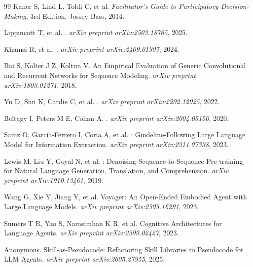\documentclass[12pt,a4paper]{ctexart}
\begin{document}
\begin{thebibliography}{99}
Kaner S, Lind L, Toldi C, et al.
\newblock \emph{Facilitator's Guide to Participatory Decision-Making}, 3rd Edition.
\newblock Jossey-Bass, 2014.

Lippincott T, et al.
.
\newblock \emph{arXiv preprint arXiv:2503.18765}, 2025.

Khamsi R, et al.
.
\newblock \emph{arXiv preprint arXiv:2409.01907}, 2024.

Bai S, Kolter J Z, Koltun V.
\newblock An Empirical Evaluation of Generic Convolutional and Recurrent Networks for Sequence Modeling.
\newblock \emph{arXiv preprint arXiv:1803.01271}, 2018.

Yu D, Sun K, Cardie C, et al.
.
\newblock \emph{arXiv preprint arXiv:2202.12925}, 2022.

Beltagy I, Peters M E, Cohan A.
.
\newblock \emph{arXiv preprint arXiv:2004.05150}, 2020.

Sainz O, Garc{\'i}a-Ferrero I, Coria A, et al.
: Guideline-Following Large Language Model for Information Extraction.
\newblock \emph{arXiv preprint arXiv:2311.07398}, 2023.

Lewis M, Liu Y, Goyal N, et al.
: Denoising Sequence-to-Sequence Pre-training for Natural Language Generation, Translation, and Comprehension.
\newblock \emph{arXiv preprint arXiv:1910.13461}, 2019.

Wang G, Xie Y, Jiang Y, et al.
\newblock Voyager: An Open-Ended Embodied Agent with Large Language Models.
\newblock \emph{arXiv preprint arXiv:2305.16291}, 2023.

Sumers T R, Yao S, Narasimhan K R, et al.
\newblock Cognitive Architectures for Language Agents.
\newblock \emph{arXiv preprint arXiv:2309.02427}, 2023.

Anonymous.
\newblock Skill-as-Pseudocode: Refactoring Skill Libraries to Pseudocode for {LLM} Agents.
\newblock \emph{arXiv preprint arXiv:2605.27955}, 2025.


\end{thebibliography}
\end{document}

